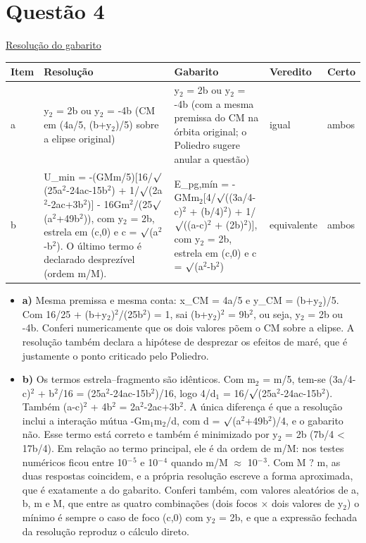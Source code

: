 \documentclass{article}%
\begin{document}
\section*{Questão 4}%
\href{https://poliedroresolve.sistemapoliedro.com.br/vestibulares/ita/2026/ita-2-fase-dia-3-30-10-2025-2-fase-dia-3/dissertativa-4-fisica-2-fase-dia-3-ita-2026}{Resolução do gabarito}\par\smallskip%
\begin{longtable}{@{}p{} p{} p{} p{} p{}@{}}\toprule Item & Resolução & Gabarito & Veredito & Certo \\ \midrule
a & y$_{2}$ = 2b ou y$_{2}$ = -4b (CM em (4a/5, (b+y$_{2}$)/5) sobre a elipse original) & y$_{2}$ = 2b ou y$_{2}$ = -4b (com a mesma premissa do CM na órbita original; o Poliedro sugere anular a questão) & igual & ambos \\
b & U\_min = -(GMm/5){[}16/$\surd$(25a$^2$-24ac-15b$^2$) + 1/$\surd$(2a$^2$-2ac+3b$^2$){]} - 16Gm$^2$/(25$\surd$(a$^2$+49b$^2$)), com y$_{2}$ = 2b, estrela em (c,0) e c = $\surd$(a$^2$-b$^2$). O último termo é declarado desprezível (ordem m/M). & E\_pg,mín = -GMm$_{2}${[}4/$\surd$((3a/4-c)$^2$ + (b/4)$^2$) + 1/$\surd$((a-c)$^2$ + (2b)$^2$){]}, com y$_{2}$ = 2b, estrela em (c,0) e c = $\surd$(a$^2$-b$^2$) & equivalente & ambos \\
\bottomrule\end{longtable}%
\begin{itemize}%
\item%
\textbf{a)} Mesma premissa e mesma conta: x\_CM = 4a/5 e y\_CM = (b+y$_{2}$)/5. Com 16/25 + (b+y$_{2}$)$^2$/(25b$^2$) = 1, sai (b+y$_{2}$)$^2$ = 9b$^2$, ou seja, y$_{2}$ = 2b ou -4b. Conferi numericamente que os dois valores põem o CM sobre a elipse. A resolução também declara a hipótese de desprezar os efeitos de maré, que é justamente o ponto criticado pelo Poliedro.%
\item%
\textbf{b)} Os termos estrela--fragmento são idênticos. Com m$_{2}$ = m/5, tem{-}se (3a/4-c)$^2$ + b$^2$/16 = (25a$^2$-24ac-15b$^2$)/16, logo 4/d$_{1}$ = 16/$\surd$(25a$^2$-24ac-15b$^2$). Também (a-c)$^2$ + 4b$^2$ = 2a$^2$-2ac+3b$^2$. A única diferença é que a resolução inclui a interação mútua -Gm$_{1}$m$_{2}$/d, com d = $\surd$(a$^2$+49b$^2$)/4, e o gabarito não. Esse termo está correto e também é minimizado por y$_{2}$ = 2b (7b/4 < 17b/4). Em relação ao termo principal, ele é da ordem de m/M: nos testes numéricos ficou entre 10$^{-}$$^{5}$ e 10$^{-}$$^{4}$ quando m/M $\approx$ 10$^{-}$$^3$. Com M ? m, as duas respostas coincidem, e a própria resolução escreve a forma aproximada, que é exatamente a do gabarito. Conferi também, com valores aleatórios de a, b, m e M, que entre as quatro combinações (dois focos $\times$ dois valores de y$_{2}$) o mínimo é sempre o caso de foco (c,0) com y$_{2}$ = 2b, e que a expressão fechada da resolução reproduz o cálculo direto.%
\end{itemize}%
\end{document}

